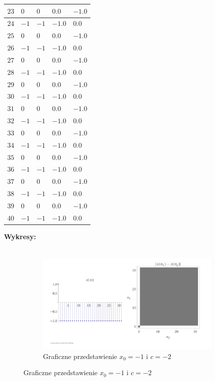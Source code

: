 \documentclass{article}
\begin{document}
\begin{center}
\begin{tabular}{|p{}|p{}|p{}|p{}|p{}| }
		\hline
		$23$ & $0$ & $0$ & $0.0$ & $-1.0$ \\ 
		\hline
		$24$ & $-1$ & $-1$ & $-1.0$ & $0.0$ \\ 
		\hline
		$25$ & $0$ & $0$ & $0.0$ & $-1.0$ \\ 
		\hline
		$26$ & $-1$ & $-1$ & $-1.0$ & $0.0$ \\ 
		\hline
		$27$ & $0$ & $0$ & $0.0$ & $-1.0$ \\ 
		\hline
		$28$ & $-1$ & $-1$ & $-1.0$ & $0.0$ \\ 
		\hline
		$29$ & $0$ & $0$ & $0.0$ & $-1.0$ \\ 
		\hline
		$30$ & $-1$ & $-1$ & $-1.0$ & $0.0$ \\ 
		\hline
		$31$ & $0$ & $0$ & $0.0$ & $-1.0$ \\ 
		\hline
		$32$ & $-1$ & $-1$ & $-1.0$ & $0.0$ \\ 
		\hline
		$33$ & $0$ & $0$ & $0.0$ & $-1.0$ \\ 
		\hline
		$34$ & $-1$ & $-1$ & $-1.0$ & $0.0$ \\ 
		\hline
		$35$ & $0$ & $0$ & $0.0$ & $-1.0$ \\ 
		\hline
		$36$ & $-1$ & $-1$ & $-1.0$ & $0.0$ \\ 
		\hline
		$37$ & $0$ & $0$ & $0.0$ & $-1.0$ \\ 
		\hline
		$38$ & $-1$ & $-1$ & $-1.0$ & $0.0$ \\ 
		\hline
		$39$ & $0$ & $0$ & $0.0$ & $-1.0$ \\ 
		\hline
		$40$ & $-1$ & $-1$ & $-1.0$ & $0.0$ \\ 
		\hline
	\end{tabular}
\end{center}
\newpage
\noindent \textbf{Wykresy:}\\\\
\begin{figure}[ht]
	\centering
	\begin{subfigure}{1\textwidth}
		\centering
		\includegraphics[width=.8\linewidth]{WolfPlots/-2-1}  
		\caption*{Graficzne przedstawienie $x_{0}=-1$ i $c = -2$ }
		
	\end{subfigure}
\end{figure}\\
\end{document}
